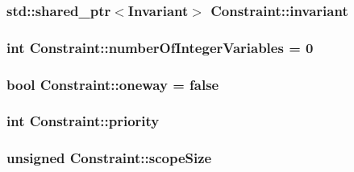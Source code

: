 \hypertarget{class_constraint_ad1aa16aebdbfff66d761850f0e70e5c8}{
\subsubsection[{invariant}]{\setlength{\rightskip}{0pt plus 5cm}std\-::shared\-\_\-ptr$<${\bf Invariant}$>$ Constraint\-::invariant\hspace{0.3cm}{\ttfamily [protected]}}}\label{class_constraint_ad1aa16aebdbfff66d761850f0e70e5c8}
\hypertarget{class_constraint_a010acf737425b29cb7a8f9263ecb02eb}{
\subsubsection[{number\-Of\-Integer\-Variables}]{\setlength{\rightskip}{0pt plus 5cm}int Constraint\-::number\-Of\-Integer\-Variables = 0\hspace{0.3cm}{\ttfamily [protected]}}}\label{class_constraint_a010acf737425b29cb7a8f9263ecb02eb}
\hypertarget{class_constraint_a9cc8e2f30e52abe6eb19311269f628ce}{
\subsubsection[{oneway}]{\setlength{\rightskip}{0pt plus 5cm}bool Constraint\-::oneway = false\hspace{0.3cm}{\ttfamily [protected]}}}\label{class_constraint_a9cc8e2f30e52abe6eb19311269f628ce}
\hypertarget{class_constraint_a72868dc8e9187cc8eb8b43560890b895}{
\subsubsection[{priority}]{\setlength{\rightskip}{0pt plus 5cm}int Constraint\-::priority\hspace{0.3cm}{\ttfamily [protected]}}}\label{class_constraint_a72868dc8e9187cc8eb8b43560890b895}
\hypertarget{class_constraint_afe1a5dbe5eb0c511d437d17c70960416}{
\subsubsection[{scope\-Size}]{\setlength{\rightskip}{0pt plus 5cm}unsigned Constraint\-::scope\-Size\hspace{0.3cm}{\ttfamily [protected]}}}\label{class_constraint_afe1a5dbe5eb0c511d437d17c70960416}
